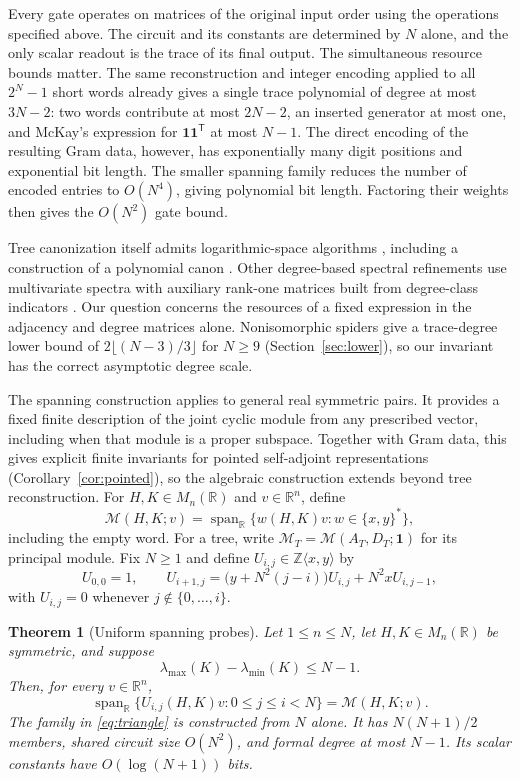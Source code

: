 \documentclass[11pt,letterpaper]{article}
\newtheorem{theorem}{Theorem}[section]
\theoremstyle{definition}\newtheorem{definition}[theorem]{Definition}
\theoremstyle{remark}\newtheorem{remark}[theorem]{Remark}
\DeclareMathOperator{\spanop}{span}\DeclareMathOperator{\im}{im}
\newcommand{\R}{\mathbb R}\newcommand{\Q}{\mathbb Q}\newcommand{\Z}{\mathbb Z}
\newcommand{\one}{\mathbf1}\newcommand{\M}{\mathcal M}
\begin{document}
Every gate operates on matrices of the original input order using the operations specified above. The circuit and its constants are determined by $N$ alone, and the only scalar readout is the trace of its final output. The simultaneous resource bounds matter. The same reconstruction and integer encoding applied to all $2^N-1$ short words already gives a single trace polynomial of degree at most $3N-2$: two words contribute at most $2N-2$, an inserted generator at most one, and McKay's expression for $\one\one^{\mathsf T}$ at most $N-1$. The direct encoding of the resulting Gram data, however, has exponentially many digit positions and exponential bit length. The smaller spanning family reduces the number of encoded entries to $O(N^4)$, giving polynomial bit length. Factoring their weights then gives the $O(N^2)$ gate bound.

Tree canonization itself admits logarithmic-space algorithms \cite{Lindell}, including a construction of a polynomial canon \cite{ADFK}. Other degree-based spectral refinements use multivariate spectra with auxiliary rank-one matrices built from degree-class indicators \cite{WangZhao}. Our question concerns the resources of a fixed expression in the adjacency and degree matrices alone. Nonisomorphic spiders give a trace-degree lower bound of $2\lfloor(N-3)/3\rfloor$ for $N\ge9$ (Section~\ref{sec:lower}), so our invariant has the correct asymptotic degree scale.

The spanning construction applies to general real symmetric pairs. It provides a fixed finite description of the joint cyclic module from any prescribed vector, including when that module is a proper subspace. Together with Gram data, this gives explicit finite invariants for pointed self-adjoint representations (Corollary~\ref{cor:pointed}), so the algebraic construction extends beyond tree reconstruction. For $H,K\in M_n(\R)$ and $v\in\R^n$, define
\[
\M(H,K;v)=\spanop_{\R}\{w(H,K)v:w\in\{x,y\}^{*}\},
\]
including the empty word. For a tree, write $\M_T=\M(A_T,D_T;\one)$ for its principal module. Fix $N\ge1$ and define $U_{i,j}\in\Z\langle x,y\rangle$ by
\begin{equation}\label{eq:triangle}
U_{0,0}=1,\qquad
U_{i+1,j}=\bigl(y+N^2(j-i)\bigr)U_{i,j}
                 +N^2xU_{i,j-1},
\end{equation}
with $U_{i,j}=0$ whenever $j\notin\{0,\ldots,i\}$.

\begin{theorem}[Uniform spanning probes]\label{thm:probes}
Let $1\le n\le N$, let $H,K\in M_n(\R)$ be symmetric, and suppose
\[
\lambda_{\max}(K)-\lambda_{\min}(K)\le N-1.
\]
Then, for every $v\in\R^n$,
\begin{equation}\label{eq:span}
\spanop_{\R}\{U_{i,j}(H,K)v:0\le j\le i<N\}=\M(H,K;v).
\end{equation}
The family in \eqref{eq:triangle} is constructed from $N$ alone. It has $N(N+1)/2$ members, shared circuit size $O(N^2)$, and formal degree at most $N-1$. Its scalar constants have $O(\log(N+1))$ bits.
\end{theorem}
\end{document}
